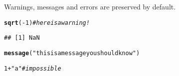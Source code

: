 \documentclass{article}\usepackage[]{graphicx}\usepackage[]{xcolor}
\makeatletter
\newcommand{\hlnum}[1]{\textcolor[rgb]{0.686,0.059,0.569}{#1}}%
\newcommand{\hlsng}[1]{\textcolor[rgb]{0.192,0.494,0.8}{#1}}%
\newcommand{\hlcom}[1]{\textcolor[rgb]{0.678,0.584,0.686}{\textit{#1}}}%
\newcommand{\hlopt}[1]{\textcolor[rgb]{0,0,0}{#1}}%
\newcommand{\hldef}[1]{\textcolor[rgb]{0.345,0.345,0.345}{#1}}%
\newcommand{\hlkwd}[1]{\textcolor[rgb]{0.737,0.353,0.396}{\textbf{#1}}}%
\newenvironment{kframe}{%
 \def\at@end@of@kframe{}%
 \ifinner\ifhmode%
  \def\at@end@of@kframe{\end{minipage}}%
  \begin{minipage}{\columnwidth}%
 \fi\fi%
 \def\FrameCommand##1{\hskip\@totalleftmargin \hskip-\fboxsep
 \colorbox{shadecolor}{##1}\hskip-\fboxsep
     \hskip-\linewidth \hskip-\@totalleftmargin \hskip\columnwidth}%
 \MakeFramed {\advance\hsize-\width
   \@totalleftmargin\z@ \linewidth\hsize
   \@setminipage}}%
 {\par\unskip\endMakeFramed%
 \at@end@of@kframe}
\newenvironment{knitrout}{}{} %
\makeatother
\begin{document}
Warnings, messages and errors are preserved by default.

\begin{knitrout}
\color{fgcolor}\begin{kframe}
\begin{alltt}
\hlkwd{sqrt}\hldef{(}\hlopt{-}\hlnum{1}\hldef{)}  \hlcom{# here is a warning!}
\end{alltt}


{\ttfamily\noindent\color{warningcolor}{\#\# Warning in sqrt(-1): NaNs produced}}\begin{verbatim}
## [1] NaN
\end{verbatim}
\begin{alltt}
\hlkwd{message}\hldef{(}\hlsng{"this is a message you should know"}\hldef{)}
\end{alltt}


{\ttfamily\noindent\itshape\color{messagecolor}{\#\# this is a message you should know}}\begin{alltt}
\hlnum{1} \hlopt{+} \hlsng{"a"}  \hlcom{# impossible}
\end{alltt}


{\ttfamily\noindent\bfseries{}}\end{kframe}
\end{knitrout}
\end{document}
